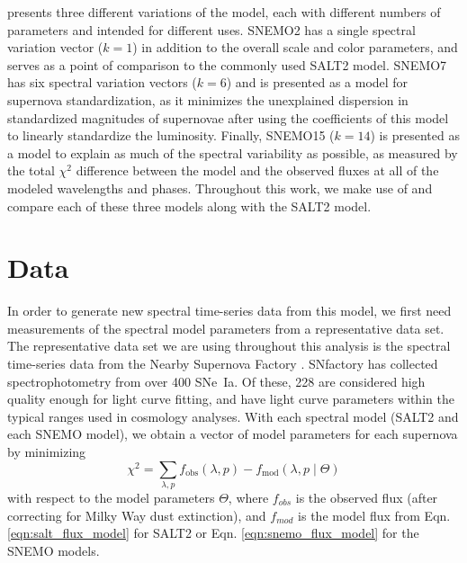 \cite{saunders_snemo_2018} presents three different variations of the model, each with different numbers of parameters and intended for different uses. SNEMO2 has a single spectral variation vector ($k=1$) in addition to the overall scale and color parameters, and serves as a point of comparison to the commonly used SALT2 model. SNEMO7 has six spectral variation vectors ($k=6$) and is presented as a model for supernova standardization, as it minimizes the unexplained dispersion in standardized magnitudes of supernovae after using the coefficients of this model to linearly standardize the luminosity. Finally, SNEMO15 ($k=14$) is presented as a model to explain as much of the spectral variability as possible, as measured by the total $\chi^2$ difference between the model and the observed fluxes at all of the modeled wavelengths and phases. Throughout this work, we make use of and compare each of these three models along with the SALT2 model.

\section{Data}
\label{sec:data}
In order to generate new spectral time-series data from this model, we first need measurements of the spectral model parameters from a representative data set. The representative data set we are using throughout this analysis is the spectral time-series data from the Nearby Supernova Factory \citep[SNfactory;][]{aldering_overview_2002}. SNfactory has collected spectrophotometry from over 400 SNe~Ia. Of these, 228 are considered high quality enough for light curve fitting, and have light curve parameters within the typical ranges used in cosmology analyses. With each spectral model (SALT2 and each SNEMO model), we obtain a vector of model parameters for each supernova by minimizing
\begin{equation}
    \chi^2 = \displaystyle\sum_{\lambda, p} f_\text{obs}(\lambda, p) - f_\text{mod}(\lambda, p\;|\; \Theta)
\end{equation}
with respect to the model parameters $\Theta$, where $f_{obs}$ is the observed flux (after correcting for Milky Way dust extinction), and $f_{mod}$ is the model flux from Eqn. \ref{eqn:salt_flux_model} for SALT2 or Eqn. \ref{eqn:snemo_flux_model} for the SNEMO models.

